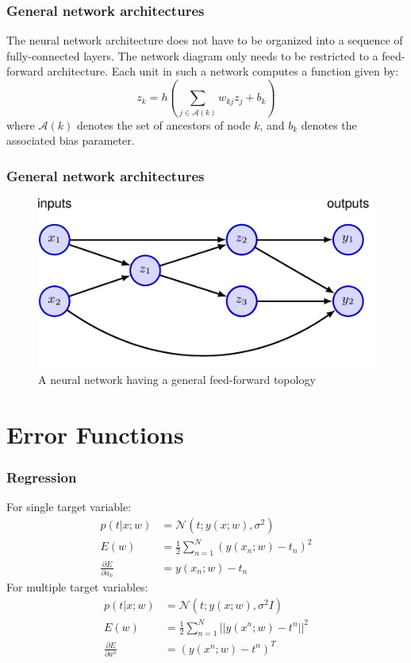 \documentclass{beamer}
\begin{document}
\begin{frame}
    \frametitle{General network architectures}
    The neural network architecture does not have to be organized into a sequence of fully-connected layers. The network diagram only needs to be restricted to a feed-forward architecture. Each unit in such a network computes a function given by:
    \begin{equation*}
        z_{k}=h(\sum_{j\in\mathcal{A}(k)}w_{kj}z_{j}+b_{k})
    \end{equation*}
    where $\mathcal{A}(k)$ denotes the set of ancestors of node $k$, and $b_{k}$ denotes the associated bias parameter.
\end{frame}

\begin{frame}
    \frametitle{General network architectures}
    \begin{figure}
        \caption{A neural network having a general feed-forward topology}
        \includegraphics{Figure_15.pdf}
    \end{figure}
\end{frame}

\section{Error Functions}

\begin{frame}
    \frametitle{Regression}
    For single target variable:
    \begin{align*}
        p(t|x;w)&=\mathcal{N}(t;y(x;w),\sigma^{2}) \\
        E(w)&=\frac{1}{2}\sum_{n=1}^{N}(y(x_{n};w)-t_{n})^{2} \\
        \frac{\partial{}E}{\partial{}a_{n}}&=y(x_{n};w)-t_{n}
    \end{align*}
    For multiple target variables:
    \begin{align*}
        p(t|x;w)&=\mathcal{N}(t;y(x;w),\sigma^{2}I) \\
        E(w)&=\frac{1}{2}\sum_{n=1}^{N}||y(x^{n};w)-t^{n}||^{2} \\
        \frac{\partial{}E}{\partial{}a^{n}}&=(y(x^{n};w)-t^{n})^{T}
    \end{align*}
\end{frame}
\end{document}
